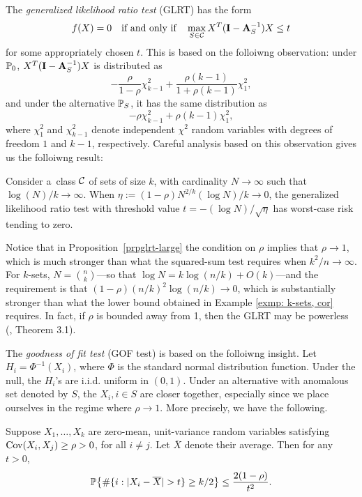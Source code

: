 \documentclass[10pt, oneside]{article}
\begin{document}
The \textit{generalized likelihood ratio test} (GLRT) has the form
%
\[
f(X)=0  \quad\mbox{if and only if}\quad
\max_{S \in{\mathcal C}} X^T (\mathbf{I}- \mathbf{A}_S^{-1}) X \leq t
\]
%
for some appropriately chosen $t$. This is based on the folloiwng observation:
under $\mathbb{P}_0$, $X^T (\mathbf{I}- \mathbf{A}_S^{-1}) X$ is distributed as
%
\[
- \frac{\rho}{1-\rho} \chi^2_{k-1} + \frac{\rho(k-1)}{1 + \rho(k-1)} \chi^2_1,
\]
%
and under the alternative $\mathbb{P}_S$, it has the same distribution as
%
\[
-\rho\chi^2_{k-1} + \rho(k-1) \chi^2_{1},
\]
%
where $\chi_1^2$ and $\chi_{k-1}^2$ denote independent $\chi^2$
random variables with degrees of freedom $1$ and $k-1$, respectively. Careful analysis based on this observation gives us the folloiwng result:

\begin{prop} \label{prpglrt-large}
Consider a~class ${\mathcal C}$ of sets of size $k$, with cardinality $N \to
\infty$ such that $\log(N)/k
\to\infty$. When $\eta:= (1-\rho) N^{2/k} (\log N)/k \to0$, the
generalized likelihood
ratio test with threshold value $t = -(\log N)/\sqrt{\eta}$ has
worst-case
risk tending to zero.
\end{prop}

Notice that in Proposition~\ref{prpglrt-large} the condition on $\rho
$ implies
that $\rho\to1$, which is much stronger than what the squared-sum
test requires when $k^2/n \to\infty$.
For $k$-sets, $N = {n \choose k}$---so that $\log N = k \log(n/k) +
O(k)$---and the requirement is that $(1-\rho) (n/k)^2 \log(n/k) \to
0$, which is substantially stronger than what the lower bound obtained
in Example \ref{exmp: k-sets, cor} requires. In fact, if $\rho$ is bounded away from 1, then the GLRT may be powerless (\cite{arias2012correlation}, Theorem 3.1).


The \textit{goodness of fit test} (GOF test) is based on the folloiwng insight.
Let $H_i = \Phi^{-1}(X_i)$, where $\Phi$ is the standard normal distribution
function. Under the null, the $H_i$'s are i.i.d. uniform in $(0,1)$.
Under an alternative with anomalous set denoted by $S$, the $X_i, i
\in S$ are closer together, especially since we place ourselves in the
regime where $\rho\to1$. More precisely, we have the following.
%
\begin{lem} \label{lemclose}
Suppose $X_1,\ldots, X_k$ are
zero-mean, unit-variance
random variables satisfying $\operatorname{Cov}(X_i, X_j) \geq\rho> 0$, for all $i
\neq j$. Let $\overline{X}$ denote their average. Then for any $t > 0$,
%
\[
\mathbb{P}\bigl\{ \# \{i: |X_i - \overline{X}| > t\} \geq k/2\bigr\}
\leq\frac{2(1-\rho)}{t^2}.
\]
%
\end{lem}
\end{document}
